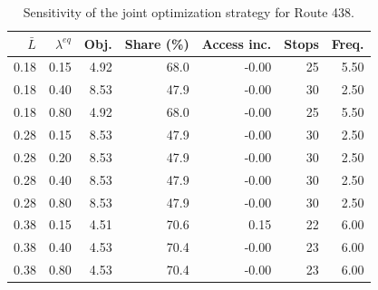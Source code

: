 \begin{table}[htbp]
\centering
\small
\caption{Sensitivity of the joint optimization strategy for Route 438.}
\label{tab:route438_sensitivity}
\begin{tabular}{rrrrrrr}
\toprule
\(\bar L\) & \(\lambda^{eq}\) & Obj. & Share (\%) & Access inc. & Stops & Freq. \\
\midrule
0.18 & 0.15 & 4.92 & 68.0 & -0.00 & 25 & 5.50 \\
0.18 & 0.40 & 8.53 & 47.9 & -0.00 & 30 & 2.50 \\
0.18 & 0.80 & 4.92 & 68.0 & -0.00 & 25 & 5.50 \\
0.28 & 0.15 & 8.53 & 47.9 & -0.00 & 30 & 2.50 \\
0.28 & 0.20 & 8.53 & 47.9 & -0.00 & 30 & 2.50 \\
0.28 & 0.40 & 8.53 & 47.9 & -0.00 & 30 & 2.50 \\
0.28 & 0.80 & 8.53 & 47.9 & -0.00 & 30 & 2.50 \\
0.38 & 0.15 & 4.51 & 70.6 & 0.15 & 22 & 6.00 \\
0.38 & 0.40 & 4.53 & 70.4 & -0.00 & 23 & 6.00 \\
0.38 & 0.80 & 4.53 & 70.4 & -0.00 & 23 & 6.00 \\
\bottomrule
\end{tabular}
\end{table}
